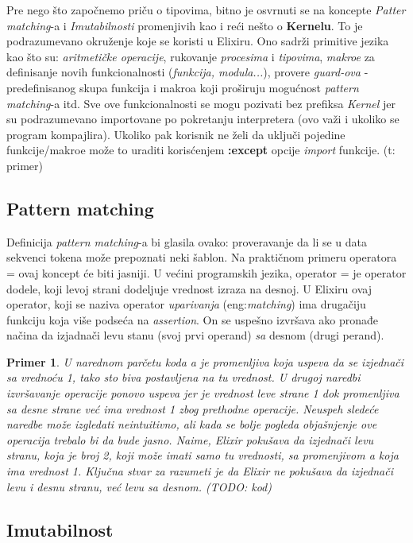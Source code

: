 \documentclass[a4paper]{article}
\newtheorem{primer}{Primer}[section]
\begin{document}
Pre nego što započnemo priču o tipovima, bitno je osvrnuti se na koncepte \textit{Patter matching}-a i \textit{Imutabilnosti} promenjivih kao i reći nešto o \textbf{Kernelu}. To je podrazumevano okruženje koje se koristi u Elixiru. Ono sadrži primitive jezika kao što su: \textit{aritmetičke operacije}, rukovanje \textit{procesima} i \textit{tipovima}, \textit{makroe} za definisanje novih funkcionalnosti (\textit{funkcija, modula...}), provere \textit{guard-ova} - predefinisanog skupa funkcija i makroa koji proširuju mogućnost \textit{pattern matching}-a itd. Sve ove funkcionalnosti se mogu pozivati bez prefiksa \textit{Kernel} jer su podrazumevano importovane po pokretanju interpretera (ovo važi i ukoliko se program kompajlira). Ukoliko pak korisnik ne želi da uključi pojedine funkcije/makroe može to uraditi korisćenjem \textbf{:except} opcije \textit{import} funkcije. (t: primer)

\subsection{Pattern matching}
\label{sec:pattern}
Definicija \textit{pattern matching}-a bi glasila ovako: proveravanje da li se u data sekvenci tokena može prepoznati neki šablon. Na praktičnom primeru operatora = ovaj koncept će biti jasniji. 
U većini programskih jezika, operator = je operator dodele, koji levoj strani dodeljuje vrednost izraza na desnoj. U Elixiru ovaj operator, koji se naziva operator \textit{uparivanja} (eng:\textit{matching}) ima drugačiju funkciju koja više podseća na \textit{assertion}. On se uspešno izvršava ako pronađe načina da izjadnači levu stanu (svoj prvi operand) \textit{sa} desnom (drugi perand).
\begin{primer}
U narednom parčetu koda \textit{a} je promenljiva koja uspeva da se izjednači sa vrednoću 1, tako sto biva postavljena na tu vrednost. U drugoj naredbi izvršavanje operacije ponovo uspeva jer je vrednost leve strane 1 dok promenljiva sa desne strane već ima vrednost 1 zbog prethodne operacije. Neuspeh sledeće naredbe može izgledati neintuitivno, ali kada se bolje pogleda objašnjenje ove operacija trebalo bi da bude jasno. Naime, Elixir pokušava da izjednači levu stranu, koja je broj 2, koji može imati samo tu vrednosti, sa promenjivom \textit{a} koja ima vrednost 1. Ključna stvar za razumeti je da Elixir ne pokušava da izjednači levu \textit{i} desnu stranu, već levu \textit{sa} desnom.
(TODO: kod)
\end{primer}
\subsection{Imutabilnost}
\label{sec:tipovi}
\end{document}
